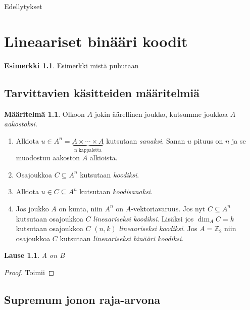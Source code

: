 \documentclass[a4paper,12pt,leqno,oneside]{report} %
\theoremstyle{plain}
\newtheorem{lause}{Lause}[chapter]
\theoremstyle{definition}
\newtheorem{maaritelma}{Määritelmä}[chapter]
\newtheorem{esimerkki}{Esimerkki}[chapter]
\theoremstyle{remark}
\numberwithin{equation}{chapter}
\newcommand*{\Zset}{\mathbb{Z}}  %
\begin{document}
Edellytykset 



\chapter{Lineaariset binääri koodit}\label{ch: Lineaariset binääri koodit}

\begin{esimerkki}
    Esimerkki mistä puhutaan
\end{esimerkki}

\section{Tarvittavien käsitteiden määritelmiä}
\begin{maaritelma}
    Olkoon $A$ jokin äärellinen joukko, kutsumme joukkoa $A$ \emph{aakostoksi}.

    \begin{enumerate}
        \item Alkiota $u \in  A^n = \underbrace{A \times \cdots \times A}_{\text{n kappaletta}}$ kutsutaan \emph{sanaksi}. Sanan $u$ pituus on $n$ ja se muodostuu aakoston $A$ alkioista.
        \item Osajoukkoa $C \subseteq A^n$ kutsutaan \emph{koodiksi}.
        \item Alkiota $u \in C \subseteq A^n$ kutsutaan \emph{koodisanaksi}.
        \item Jos joukko $A$ on kunta, niin $A^n$ on $A$-vektoriavaruus. Jos nyt $C \subseteq A^n$ kutsutaan osajoukkoa $C$ \emph{lineaariseksi koodiksi}. Lisäksi jos $\dim_A C = k$ kutsutaan osajoukkoa $C$ $(n, k)$ \emph{lineaariseksi koodiksi}. Jos $A = \Zset_2$ niin osajoukkoa $C$ kutsutaan \emph{lineaariseksi binääri koodiksi}.
    \end{enumerate}
\end{maaritelma}


\begin{lause}\label{thm: kasautumispisteen ympäristössä}
    A on B
\end{lause}

\begin{proof}
    Toimii
\end{proof}

\section{Supremum jonon raja-arvona}%
\label{sec: Supremum jonon raja-arvona}
\end{document}
